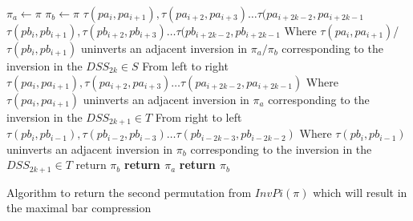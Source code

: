     \begin{algorithm}[!htp]
         \begin{algorithmic}[1]
                \State \small{$\pi_{a} \gets \pi$}
                \State \small{$\pi_{b} \gets \pi$}
                    \State $\tau(pa_{i},pa_{i+1}),\tau(pa_{i+2},pa_{i+3}) \dots \tau(pa_{i+2k-2},pa_{i+2k-1}$ 
                    \State $\tau(pb_{i},pb_{i+1}),\tau(pb_{i+2},pb_{i+3}) \dots \tau(pb_{i+2k-2},pb_{i+2k-1}$ 
                    \State \small{Where $\tau(pa_{i},pa_{i+1})$/$\tau(pb_{i},pb_{i+1})$ uninverts an adjacent 
                    inversion in $\pi_{a}/\pi_{b}$ corresponding to the inversion in the $DSS_{2k} \in S$}
                \EndFor
                    \State From left to right $\tau(pa_{i},pa_{i+1}),\tau(pa_{i+2},pa_{i+3}) \dots \tau(pa_{i+2k-2},pa_{i+2k-1})$
                    \State \small{Where $\tau(pa_{i},pa_{i+1})$ uninverts an adjacent 
                    inversion in $\pi_{a}$ corresponding to the inversion in the $DSS_{2k+1}\in T$}
                \EndFor
                    \State From right to left $\tau(pb_{i},pb_{i-1}),\tau(pb_{i-2},pb_{i-3}) \dots \tau(pb_{i-2k-3},pb_{i-2k-2})$
                    \State \small{Where $\tau(pb_{i},pb_{i-1})$ uninverts an adjacent 
                    inversion in $\pi_{b}$ corresponding to the inversion in the $DSS_{2k+1}\in T$}
                \EndFor
                    \State return $\pi_{b}$
                    \State \textbf{return $\pi_{a}$}
                \Else 
                    \State \textbf{return $\pi_{b}$}
                \EndIf

            \EndFunction
        
        \end{algorithmic} 
        \caption{Algorithm to return the second permutation from $InvPi(\pi)$ which will result in the maximal bar compression}
        \label{Algo:PreProcessRow}
\end{algorithm}\pagebreak

